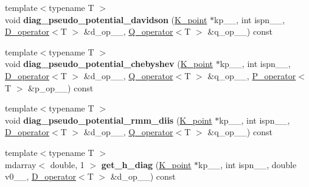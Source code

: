 \begin{DoxyCompactItemize}
\item 
\hypertarget{classsirius_1_1_band_a6def3c3503a012beffdb603f42ac40ef}{}{\footnotesize template$<$typename T $>$ }\\void {\bfseries diag\+\_\+pseudo\+\_\+potential\+\_\+davidson} (\hyperlink{classsirius_1_1_k__point}{K\+\_\+point} $\ast$kp\+\_\+\+\_\+, int ispn\+\_\+\+\_\+, \hyperlink{classsirius_1_1_d__operator}{D\+\_\+operator}$<$T $>$ \&d\+\_\+op\+\_\+\+\_\+, \hyperlink{classsirius_1_1_q__operator}{Q\+\_\+operator}$<$T $>$ \&q\+\_\+op\+\_\+\+\_\+) const \label{classsirius_1_1_band_a6def3c3503a012beffdb603f42ac40ef}

\item 
\hypertarget{classsirius_1_1_band_a6c3038b6cccb24d8d4437a15b115cca4}{}{\footnotesize template$<$typename T $>$ }\\void {\bfseries diag\+\_\+pseudo\+\_\+potential\+\_\+chebyshev} (\hyperlink{classsirius_1_1_k__point}{K\+\_\+point} $\ast$kp\+\_\+\+\_\+, int ispn\+\_\+\+\_\+, \hyperlink{classsirius_1_1_d__operator}{D\+\_\+operator}$<$T $>$ \&d\+\_\+op\+\_\+\+\_\+, \hyperlink{classsirius_1_1_q__operator}{Q\+\_\+operator}$<$T $>$ \&q\+\_\+op\+\_\+\+\_\+, \hyperlink{classsirius_1_1_p__operator}{P\+\_\+operator}$<$T $>$ \&p\+\_\+op\+\_\+\+\_\+) const \label{classsirius_1_1_band_a6c3038b6cccb24d8d4437a15b115cca4}

\item 
\hypertarget{classsirius_1_1_band_af3271dc285f20a4445587b9c031fbdb5}{}{\footnotesize template$<$typename T $>$ }\\void {\bfseries diag\+\_\+pseudo\+\_\+potential\+\_\+rmm\+\_\+diis} (\hyperlink{classsirius_1_1_k__point}{K\+\_\+point} $\ast$kp\+\_\+\+\_\+, int ispn\+\_\+\+\_\+, \hyperlink{classsirius_1_1_d__operator}{D\+\_\+operator}$<$T $>$ \&d\+\_\+op\+\_\+\+\_\+, \hyperlink{classsirius_1_1_q__operator}{Q\+\_\+operator}$<$T $>$ \&q\+\_\+op\+\_\+\+\_\+) const \label{classsirius_1_1_band_af3271dc285f20a4445587b9c031fbdb5}

\item 
\hypertarget{classsirius_1_1_band_ac568f5ad27fb61324743b13585aedc7e}{}{\footnotesize template$<$typename T $>$ }\\mdarray$<$ double, 1 $>$ {\bfseries get\+\_\+h\+\_\+diag} (\hyperlink{classsirius_1_1_k__point}{K\+\_\+point} $\ast$kp\+\_\+\+\_\+, int ispn\+\_\+\+\_\+, double v0\+\_\+\+\_\+, \hyperlink{classsirius_1_1_d__operator}{D\+\_\+operator}$<$T $>$ \&d\+\_\+op\+\_\+\+\_\+) const \label{classsirius_1_1_band_ac568f5ad27fb61324743b13585aedc7e}


\end{DoxyCompactItemize}
